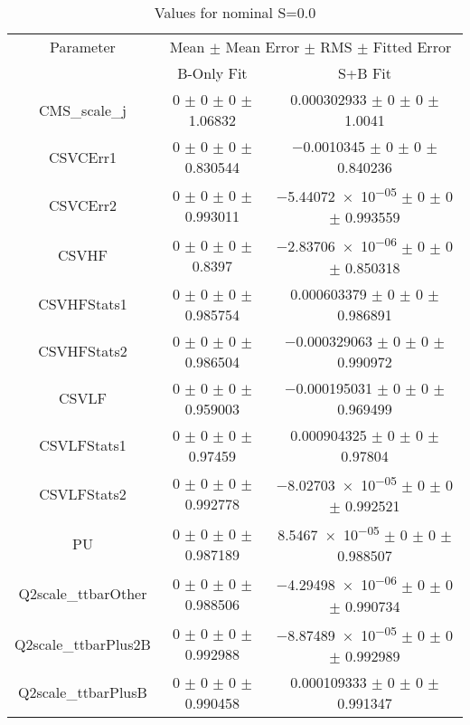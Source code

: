 \begin{table}
\centering
\caption{Values for nominal S=0.0}
\begin{tabular}{ccc}
\toprule
Parameter & \multicolumn{2}{c}{Mean $\pm$ Mean Error $\pm$ RMS $\pm$ Fitted Error}\\
 & B-Only Fit & S+B Fit\\
\midrule
CMS\_scale\_j & \num{0} $\pm$ \num{0} $\pm$ \num{0} $\pm$ \num{1.06832} & \num{0.000302933} $\pm$ \num{0} $\pm$ \num{0} $\pm$ \num{1.0041}\\
CSVCErr1 & \num{0} $\pm$ \num{0} $\pm$ \num{0} $\pm$ \num{0.830544} & \num{-0.0010345} $\pm$ \num{0} $\pm$ \num{0} $\pm$ \num{0.840236}\\
CSVCErr2 & \num{0} $\pm$ \num{0} $\pm$ \num{0} $\pm$ \num{0.993011} & \num{-5.44072e-05} $\pm$ \num{0} $\pm$ \num{0} $\pm$ \num{0.993559}\\
CSVHF & \num{0} $\pm$ \num{0} $\pm$ \num{0} $\pm$ \num{0.8397} & \num{-2.83706e-06} $\pm$ \num{0} $\pm$ \num{0} $\pm$ \num{0.850318}\\
CSVHFStats1 & \num{0} $\pm$ \num{0} $\pm$ \num{0} $\pm$ \num{0.985754} & \num{0.000603379} $\pm$ \num{0} $\pm$ \num{0} $\pm$ \num{0.986891}\\
CSVHFStats2 & \num{0} $\pm$ \num{0} $\pm$ \num{0} $\pm$ \num{0.986504} & \num{-0.000329063} $\pm$ \num{0} $\pm$ \num{0} $\pm$ \num{0.990972}\\
CSVLF & \num{0} $\pm$ \num{0} $\pm$ \num{0} $\pm$ \num{0.959003} & \num{-0.000195031} $\pm$ \num{0} $\pm$ \num{0} $\pm$ \num{0.969499}\\
CSVLFStats1 & \num{0} $\pm$ \num{0} $\pm$ \num{0} $\pm$ \num{0.97459} & \num{0.000904325} $\pm$ \num{0} $\pm$ \num{0} $\pm$ \num{0.97804}\\
CSVLFStats2 & \num{0} $\pm$ \num{0} $\pm$ \num{0} $\pm$ \num{0.992778} & \num{-8.02703e-05} $\pm$ \num{0} $\pm$ \num{0} $\pm$ \num{0.992521}\\
PU & \num{0} $\pm$ \num{0} $\pm$ \num{0} $\pm$ \num{0.987189} & \num{8.5467e-05} $\pm$ \num{0} $\pm$ \num{0} $\pm$ \num{0.988507}\\
Q2scale\_ttbarOther & \num{0} $\pm$ \num{0} $\pm$ \num{0} $\pm$ \num{0.988506} & \num{-4.29498e-06} $\pm$ \num{0} $\pm$ \num{0} $\pm$ \num{0.990734}\\
Q2scale\_ttbarPlus2B & \num{0} $\pm$ \num{0} $\pm$ \num{0} $\pm$ \num{0.992988} & \num{-8.87489e-05} $\pm$ \num{0} $\pm$ \num{0} $\pm$ \num{0.992989}\\
Q2scale\_ttbarPlusB & \num{0} $\pm$ \num{0} $\pm$ \num{0} $\pm$ \num{0.990458} & \num{0.000109333} $\pm$ \num{0} $\pm$ \num{0} $\pm$ \num{0.991347}\\

\end{tabular}
\end{table}
